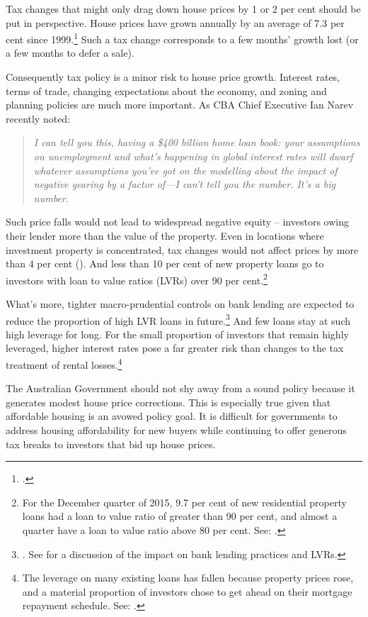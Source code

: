Tax changes that might only drag down house prices by 1 or 2 per cent should be put in perspective. House prices have grown annually by an average of 7.3 per cent since 1999.\footcites{ABS2015ResidentialPropertyIndex}{Yates2011}
Such a tax change corresponds to a few months’ growth lost (or a few months to defer a sale).

Consequently tax policy is a minor risk to house price growth.  Interest rates, terms of trade, changing expectations about the economy, and zoning and planning policies are much more important. As CBA Chief Executive Ian Narev recently noted:

\begin{quote} 
\textit{I can tell you this, having a \$400 billion home loan book: your assumptions on unemployment and what's happening in global interest rates will dwarf whatever assumptions you've got on the modelling about the impact of negative gearing by a factor of---I can't tell you the number. It's a big number.}
\end{quote}

Such price falls would not lead to widespread negative equity – investors owing their lender more than the value of the property. Even in locations where investment property is concentrated, tax changes would not affect prices by more than 4 per cent (). And less than 10 per cent of new property loans go to investors with loan to value ratios (LVRs) over 90 per cent.\footnote{For the December quarter of 2015, 9.7 per cent of new residential property loans had a loan to value ratio of greater than 90 per cent, and almost a quarter have a loan to value ratio above 80 per cent. See: \textcite{APRA2016PropertyExposures}.}

What’s more, tighter macro-prudential controls on bank lending are expected to reduce the proportion of high LVR loans in future.\footnote{\textcite{APRA2014a}. See \textcite{Schlesinger2015} for a discussion of the impact on bank lending practices and LVRs.}  
  And few loans stay at such high leverage for long.  For the small proportion of investors that remain highly leveraged, higher interest rates pose a far greater risk than changes to the tax treatment of rental losses.\footnote{The leverage on many existing loans has fallen because property prices rose, and a material proportion of investors chose to get ahead on their mortgage repayment schedule. See: \textcite{RBA2015StatsMarginLending}.} 

The Australian Government should not shy away from a sound policy because it generates modest house price corrections. 
This is especially true given that affordable housing is an avowed policy goal. It is difficult for governments to address housing affordability for new buyers while continuing to offer generous tax breaks to investors that bid up house prices. 


